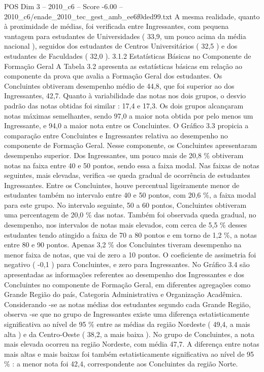 \begin{textsample}{POS Dim 3 – 2010\_c6 – Score -6.00 – 2010\_c6/enade\_2010\_tec\_gest\_amb\_ee6f0ded99.txt}
A mesma realidade, quanto à proximidade de médias, foi verificada entre Ingressantes, com pequena vantagem para estudantes de Universidades ( 33,9, um pouco acima da média nacional ), seguidos dos estudantes de Centros Universitários ( 32,5 ) e dos estudantes de Faculdades ( 32,0 ). 3.1.2 Estatísticas Básicas no Componente de Formação Geral A Tabela 3.2 apresenta as estatísticas básicas em relação ao componente da prova que avalia a Formação Geral dos estudantes.
Os Concluintes obtiveram desempenho médio de 44,8, que foi superior ao dos Ingressantes, 42,7.
Quanto à variabilidade das notas nos dois grupos, o desvio padrão das notas obtidas foi similar : 17,4 e 17,3.
Os dois grupos alcançaram notas máximas semelhantes, sendo 97,0 a maior nota obtida por pelo menos um Ingressante, e 94,0 a maior nota entre os Concluintes.
O Gráfico 3.3 propicia a comparação entre Concluintes e Ingressantes relativa ao desempenho no componente de Formação Geral.
Nesse componente, os Concluintes apresentaram desempenho superior.
Dos Ingressantes, um pouco mais de 20,8 \% obtiveram notas na faixa entre 40 e 50 pontos, sendo essa a faixa modal.
Nas faixas de notas seguintes, mais elevadas, verifica -se queda gradual de ocorrência de estudantes Ingressantes.
Entre os Concluintes, houve percentual ligeiramente menor de estudantes também no intervalo entre 40 e 50 pontos, com 20,6 \%, a faixa modal para este grupo.
No intervalo seguinte, 50 a 60 pontos, Concluintes obtiveram uma percentagem de 20,0 \% das notas.
Também foi observada queda gradual, no desempenho, nos intervalos de notas mais elevados, com cerca de 5,5 \% desses estudantes tendo atingido a faixa de 70 a 80 pontos e em torno de 1,2 \%, a notas entre 80 e 90 pontos.
Apenas 3,2 \% dos Concluintes tiveram desempenho na menor faixa de notas, que vai de zero a 10 pontos.
O coeficiente de assimetria foi negativo ( -0,1 ) para Concluintes, e zero para Ingressantes.
No Gráfico 3.4 são apresentadas as informações referentes ao desempenho dos Ingressantes e dos Concluintes no componente de Formação Geral, em diferentes agregações como Grande Região do país, Categoria Administrativa e Organização Acadêmica.
Considerando -se as notas médias dos estudantes segundo cada Grande Região, observa -se que no grupo de Ingressantes existe uma diferença estatisticamente significativa ao nível de 95 \% entre as médias da região Nordeste ( 49,4, a mais alta ) e da Centro-Oeste ( 38,2, a mais baixa ).
No grupo de Concluintes, a nota mais elevada ocorreu na região Nordeste, com média 47,7.
A diferença entre notas mais altas e mais baixas foi também estatisticamente significativa ao nível de 95 \% : a menor nota foi 42,4, correspondente aos Concluintes da região Norte.

\end{textsample}
